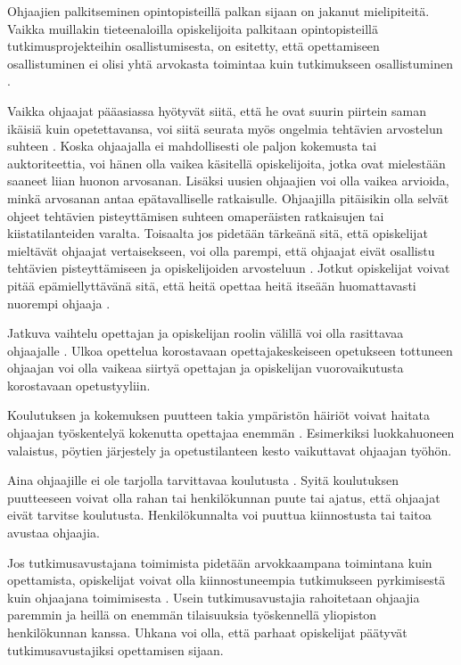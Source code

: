 \documentclass[finnish]{tktltiki2}
\theoremstyle{definition}
\theoremstyle{remark}
\begin{document}
Ohjaajien palkitseminen opintopisteillä palkan sijaan on jakanut mielipiteitä. Vaikka muillakin tieteenaloilla opiskelijoita palkitaan opintopisteillä tutkimusprojekteihin osallistumisesta, on esitetty, että opettamiseen osallistuminen ei olisi yhtä arvokasta toimintaa kuin tutkimukseen osallistuminen \cite{Reges88}. \par

Vaikka ohjaajat pääasiassa hyötyvät siitä, että he ovat suurin piirtein saman ikäisiä kuin opetettavansa, voi siitä seurata myös ongelmia tehtävien arvostelun suhteen \cite{Roberts95}. Koska ohjaajalla ei mahdollisesti ole paljon kokemusta tai auktoriteettia, voi hänen olla vaikea käsitellä opiskelijoita, jotka ovat mielestään saaneet liian huonon arvosanan. Lisäksi uusien ohjaajien voi olla vaikea arvioida, minkä arvosanan antaa epätavalliselle ratkaisulle. Ohjaajilla pitäisikin olla selvät ohjeet tehtävien pisteyttämisen suhteen omaperäisten ratkaisujen tai kiistatilanteiden varalta. Toisaalta jos pidetään tärkeänä sitä, että opiskelijat mieltävät ohjaajat vertaisekseen, voi olla parempi, että ohjaajat eivät osallistu tehtävien pisteyttämiseen ja opiskelijoiden arvosteluun \cite{Morgan02}. Jotkut opiskelijat voivat pitää epämiellyttävänä sitä, että heitä opettaa heitä itseään huomattavasti nuorempi ohjaaja \cite{Sperry08}. \par

Jatkuva vaihtelu opettajan ja opiskelijan roolin välillä voi olla rasittavaa ohjaajalle \cite{Mark11}. Ulkoa opettelua korostavaan opettajakeskeiseen opetukseen tottuneen ohjaajan voi olla vaikeaa siirtyä opettajan ja opiskelijan vuorovaikutusta korostavaan opetustyyliin. \par

Koulutuksen ja kokemuksen puutteen takia ympäristön häiriöt voivat haitata ohjaajan työskentelyä kokenutta opettajaa enemmän \cite{Patitsas12_3}. Esimerkiksi luokkahuoneen valaistus, pöytien järjestely ja opetustilanteen kesto vaikuttavat ohjaajan työhön. \par

Aina ohjaajille ei ole tarjolla tarvittavaa koulutusta \cite{Shannon98}. Syitä koulutuksen puutteeseen voivat olla rahan tai henkilökunnan puute tai ajatus, että ohjaajat eivät tarvitse koulutusta. Henkilökunnalta voi puuttua kiinnostusta tai taitoa avustaa ohjaajia. \par

Jos tutkimusavustajana toimimista pidetään arvokkaampana toimintana kuin opettamista, opiskelijat voivat olla kiinnostuneempia tutkimukseen pyrkimisestä kuin ohjaajana toimimisesta \cite{Shannon98}. Usein tutkimusavustajia rahoitetaan ohjaajia paremmin ja heillä on enemmän tilaisuuksia työskennellä yliopiston henkilökunnan kanssa. Uhkana voi olla, että parhaat opiskelijat päätyvät tutkimusavustajiksi opettamisen sijaan. \par
\end{document}
